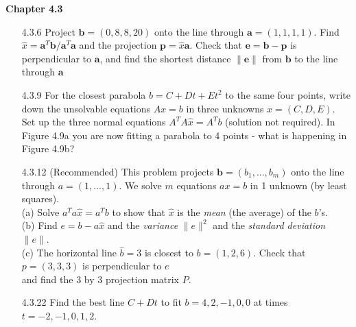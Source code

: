 \documentclass[10pt,twoside,reqno]{article}
\begin{document}
\vspace{5mm}
\textbf{Chapter 4.3}
\begin{enumerate}
\item[4.3.6] Project $\pmb{b} = (0, 8, 8, 20)$ onto the line through $\pmb{a} = (1, 1, 1, 1)$. Find $\hat{x} = \pmb{a}^T\pmb{b}/\pmb{a}^T\pmb{a}$ and the projection $\pmb{p} = \hat{x}\pmb{a}$. Check that $\pmb{e} = \pmb{b} - \pmb{p}$ is perpendicular to $\pmb{a}$, and find the shortest distance $\lVert\pmb{e}\rVert$ from $\pmb{b}$ to the line through $\pmb{a}$\\
\vspace{3mm}

\vspace{3mm}
\item[4.3.9] For the closest parabola $b = C + Dt + Et^2$ to the same four points, write down the unsolvable equations $Ax = b$ in three unknowns $x = (C, D, E)$. Set up the three normal equations $A^TA\hat{x} = A^Tb$ (solution not required). In Figure 4.9a you are now fitting a parabola to 4 points - what is happening in Figure 4.9b?\\
\vspace{3mm}

\vspace{3mm}
\item[4.3.12] (Recommended) This problem projects $\pmb{b} = (b_1, ...,b_m)$ onto the line through $a = (1,...,1)$. We solve $m$ equations $ax = b$ in 1 unknown (by least squares).\\
(a) Solve $a^Ta\hat{x} = a^Tb$ to show that $\hat{x}$ is the \textit{mean} (the average) of the $b$'s.\\
(b) Find $e = b - a\hat{x}$ and the \textit{variance} $\lVert e \rVert^2$ and the \textit{standard deviation} $\lVert e \rVert$.\\
(c) The horizontal line $\hat{b} = 3$ is closest to $b = (1, 2, 6)$. Check that $p = (3, 3, 3)$ is perpendicular to $e$ \\
\hspace{6mm}and find the 3 by 3 projection matrix $P$.\\
\vspace{3mm}

\vspace{3mm}
\item[4.3.22] Find the best line $C + Dt$ to fit $b = 4, 2, -1, 0, 0$ at times $t = -2, -1, 0, 1, 2$.\\
\vspace{3mm}


\end{enumerate}
\end{document}
